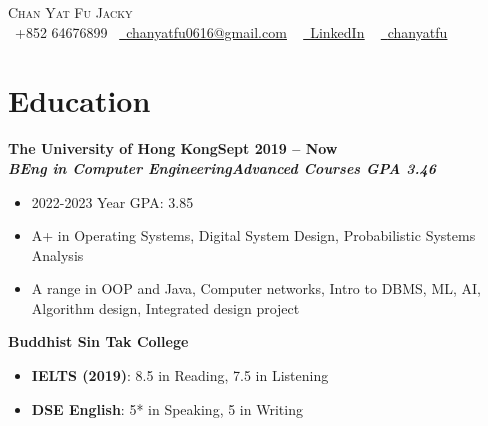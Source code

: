 \documentclass[a4paper,10pt]{article}
\begin{document}
\begin{center}
  {\Huge \scshape Chan Yat Fu Jacky} \\ \vspace{5pt}
  \small \raisebox{-0.1\height}\faPhone\ +852 64676899~ \href{mailto:chanyatfu0616@gmail.com}{\raisebox{-0.2\height}\faEnvelope\  \underline{chanyatfu0616@gmail.com}} ~
  \href{https://www.linkedin.com/in/yat-fu-chan-255b59306/}{\raisebox{-0.2\height}\faLinkedin\ \underline{LinkedIn}}  ~
  \href{https://github.com/chanyatfu}{\raisebox{-0.2\height}\faGithub\ \underline{chanyatfu}}
  \vspace{-3pt}
\end{center}

\newcommand*{\bb}[2]{{\small\bfseries#1\hfill{\small#2}}\\}
\newcommand*{\cc}[2]{{\bfseries\textit{\small#1}\hfill\textit{\small#2}}\\}
\newenvironment{tightitemize}{\begin{itemize}[leftmargin=2em,topsep=1pt,partopsep=1pt,noitemsep]\small}{\end{itemize}\vspace*{2pt}}

\section{Education}

\bb{The University of Hong Kong}{Sept 2019 -- Now}
\cc{BEng in Computer Engineering}{Advanced Courses GPA 3.46}
\begin{tightitemize}
  \item 2022-2023 Year GPA: 3.85
  \item A+ in Operating Systems, Digital System Design, Probabilistic Systems Analysis
  \item A range in OOP and Java, Computer networks, Intro to DBMS, ML, AI, Algorithm design, Integrated design project
\end{tightitemize}

\bb{Buddhist Sin Tak College}{}
\begin{tightitemize}
  \item \textbf{IELTS (2019)}: 8.5 in Reading, 7.5 in Listening
  \item \textbf{DSE English}: 5* in Speaking, 5 in Writing
\end{tightitemize}
\end{document}
